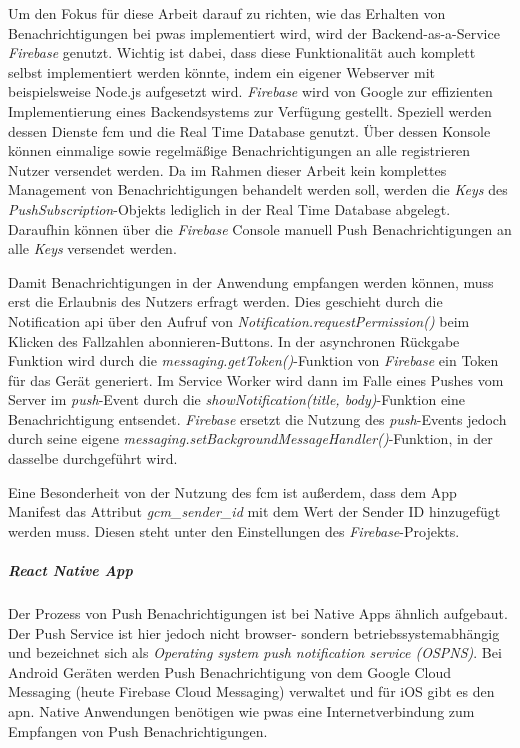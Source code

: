 Um den Fokus für diese Arbeit darauf zu richten, wie das Erhalten von Benachrichtigungen bei \acp{pwa} implementiert wird, wird der Backend-as-a-Service \textit{Firebase} genutzt.
Wichtig ist dabei, dass diese Funktionalität auch komplett selbst implementiert werden könnte, indem ein eigener Webserver mit beispielsweise Node.js aufgesetzt wird.
\textit{Firebase} wird von Google zur effizienten Implementierung eines Backendsystems zur Verfügung gestellt.
Speziell werden dessen Dienste \ac{fcm} und die Real Time Database genutzt.
Über dessen Konsole können einmalige sowie regelmäßige Benachrichtigungen an alle registrieren Nutzer versendet werden.
Da im Rahmen dieser Arbeit kein komplettes Management von Benachrichtigungen behandelt werden soll, werden die \textit{Keys} des \textit{PushSubscription}-Objekts lediglich in der Real Time Database abgelegt.
Daraufhin können über die \textit{Firebase} Console manuell Push Benachrichtigungen an alle \textit{Keys} versendet werden.

Damit Benachrichtigungen in der Anwendung empfangen werden können, muss erst die Erlaubnis des Nutzers erfragt werden.
Dies geschieht durch die Notification \ac{api} über den Aufruf von \textit{Notification.requestPermission()} beim Klicken des \glqq Fallzahlen abonnieren\grqq{}-Buttons.
In der asynchronen Rückgabe Funktion wird durch die \textit{messaging.getToken()}-Funktion von \textit{Firebase} ein Token für das Gerät generiert.
Im Service Worker wird dann im Falle eines Pushes vom Server im \textit{push}-Event durch die \textit{showNotification(title, body)}-Funktion eine Benachrichtigung entsendet.
\textit{Firebase} ersetzt die Nutzung des \textit{push}-Events jedoch durch seine eigene \textit{messaging.setBackgroundMessageHandler()}-Funktion, in der dasselbe durchgeführt wird.

Eine Besonderheit von der Nutzung des \ac{fcm} ist außerdem, dass dem App Manifest das Attribut \textit{gcm\_sender\_id} mit dem Wert der Sender ID hinzugefügt werden muss.
Diesen steht unter den Einstellungen des \textit{Firebase}-Projekts.%

\subparagraph{React Native App\\}
Der Prozess von Push Benachrichtigungen ist bei Native Apps ähnlich aufgebaut.
Der Push Service ist hier jedoch nicht browser- sondern betriebssystemabhängig und bezeichnet sich als \textit{Operating system push notification service (OSPNS)}.
Bei Android Geräten werden Push Benachrichtigung von dem Google Cloud Messaging (heute Firebase Cloud Messaging) verwaltet und für iOS gibt es den \ac{apn}.
Native Anwendungen benötigen wie \acp{pwa} eine Internetverbindung zum Empfangen von Push Benachrichtigungen.

